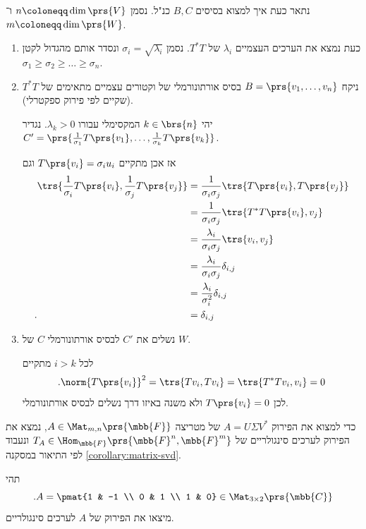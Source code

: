 \documentclass[a4paper,10pt,twoside,openany]{book}
\begin{document}
נתאר כעת איך למצוא בסיסים
$B,C$
כנ"ל.
נסמן
$n \coloneqq \dim \prs{V}$
ו־%
$m \coloneqq \dim\prs{W}$.

\begin{enumerate}
\item
כעת נמצא את הערכים העצמיים $\lambda_i$ של $T^* T$. נסמן
$\sigma_i = \sqrt{\lambda_i}$
ונסדר אותם מהגדול לקטן
$\sigma_1 \geq \sigma_2 \geq \ldots \geq \sigma_n$.

\item
ניקח
$B = \prs{v_1, \ldots, v_n}$
בסיס אורתונורמלי של וקטורים עצמיים מתאימים של
$T^* T$
(שקיים לפי פירוק ספקטרלי).

יהי
$k \in \brs{n}$
המקסימלי עבורו
$\lambda_k > 0$.
נגדיר
$C' = \prs{\frac{1}{\sigma_1} T\prs{v_1}, \ldots, \frac{1}{\sigma_k} T\prs{v_k}}$.

אז אכן מתקיים
$T\prs{v_i} = \sigma_i u_i$
וגם
\begin{align*}
\trs{\frac{1}{\sigma_i} T\prs{v_i}, \frac{1}{\sigma_j} T\prs{v_j}}
&=
\frac{1}{\sigma_i \sigma_j} \trs{T\prs{v_i}, T\prs{v_j}}
\\&=
\frac{1}{\sigma_i \sigma_j} \trs{T^* T\prs{v_i}, v_j}
\\&=
\frac{\lambda_i}{\sigma_i \sigma_j} \trs{v_i, v_j}
\\&=
\frac{\lambda_i}{\sigma_i \sigma_j} \delta_{i,j}
\\&=
\frac{\lambda_i}{\sigma_i^2} \delta_{i,j}
\\ \text{.} \hphantom{\trs{\frac{1}{\sigma_i} T\prs{v_i}, \frac{1}{\sigma_j} T\prs{v_j}}} &=
\delta_{i,j}
\end{align*}

\item
נשלים את
$C'$
לבסיס אורתונורמלי
$C$
של
$W$.

לכל
$i > k$
מתקיים
\[\text{.} \norm{T\prs{v_i}}^2 = \trs{Tv_i, Tv_i} = \trs{T^* T v_i, v_i} = 0\]
לכן
$T\prs{v_i} = 0$
ולא משנה באיזו דרך נשלים לבסיס אורתונורמלי.
\end{enumerate}

\begin{remark}
כדי למצוא את הפירוק
$A = U \Sigma V^*$
של מטריצה
$A \in \Mat_{m,n}\prs{\mbb{F}}$,
נמצא את הפירוק לערכים סינגולריים של
$T_A \in \Hom_{\mbb{F}}\prs{\mbb{F}^n, \mbb{F}^m}$
ונעבוד לפי התיאור במסקנה
\ref{corollary:matrix-svd}.
\end{remark}

\begin{exercisechap}
תהי
\[\text{.} A = \pmat{1 & -1 \\ 0 & 1 \\ 1 & 0} \in \Mat_{3 \times 2}\prs{\mbb{C}}\]
מיצאו את הפירוק של
$A$
לערכים סינגולריים.
\end{exercisechap}
\end{document}
